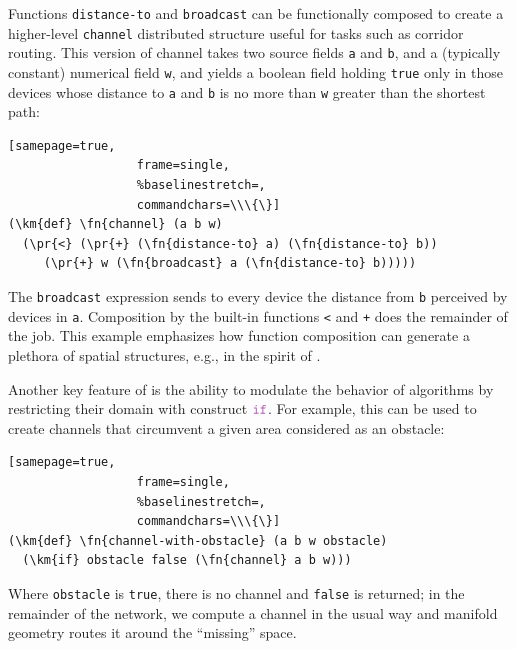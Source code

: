 \documentclass[12pt,a4paper,twoside,openright]{book}
\begin{document}
Functions \texttt{distance-to} and \texttt{broadcast} can be functionally composed to create a higher-level {\tt channel} distributed structure useful for tasks such as corridor routing.
%
This version of channel takes two source fields \texttt{a} and \texttt{b}, and a (typically constant) numerical field \texttt{w}, and yields a boolean field holding \texttt{true} only in those devices whose distance to \texttt{a} and \texttt{b} is no more than \texttt{w} greater than the shortest path:
%
\begin{Verbatim}[samepage=true,
                  frame=single,
                  %baselinestretch=,
                  commandchars=\\\{\}]
(\km{def} \fn{channel} (a b w)
  (\pr{<} (\pr{+} (\fn{distance-to} a) (\fn{distance-to} b))
     (\pr{+} w (\fn{broadcast} a (\fn{distance-to} b)))))
\end{Verbatim}
The {\tt broadcast} expression sends to every device the distance from {\tt b} perceived by devices in \texttt{a}.  Composition by the built-in functions \texttt{<} and \texttt{+} does the remainder of the job.
%
This example emphasizes how function composition can generate a plethora of spatial structures, e.g., in the spirit of \cite{anticipativegradient-SASO12}.

Another key feature of \calculus{} is the ability to modulate the behavior of algorithms by restricting their domain with construct $\ifN$.
%
For example, this can be used to create channels that circumvent a given area considered as an obstacle:
%
\begin{Verbatim}[samepage=true,
                  frame=single,
                  %baselinestretch=,
                  commandchars=\\\{\}]
(\km{def} \fn{channel-with-obstacle} (a b w obstacle)
  (\km{if} obstacle false (\fn{channel} a b w)))
\end{Verbatim}
%
Where \texttt{obstacle} is \texttt{true}, there is no channel and \texttt{false} is returned; in the remainder of the network, we compute a channel in the usual way and manifold geometry routes it around the ``missing'' space.
\end{document}
